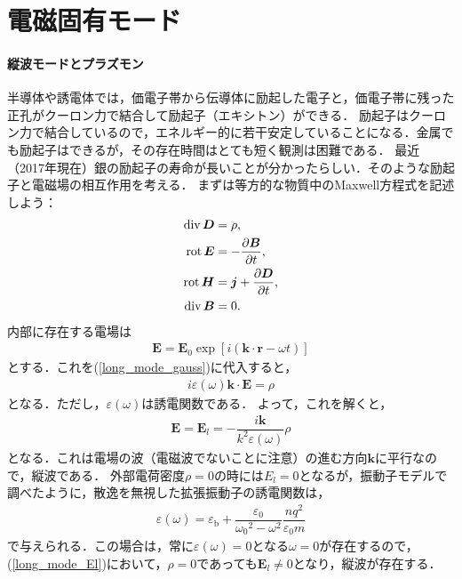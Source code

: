\relax
\section{電磁固有モード}
\paragraph{縦波モードとプラズモン}
半導体や誘電体では，価電子帯から伝導体に励起した電子と，価電子帯に残った正孔がクーロン力で結合して励起子（エキシトン）ができる．
励起子はクーロン力で結合しているので，エネルギー的に若干安定していることになる．金属でも励起子はできるが，その存在時間はとても短く観測は困難である．
最近（2017年現在）銀の励起子の寿命が長いことが分かったらしい．そのような励起子と電磁場の相互作用を考える．
まずは等方的な物質中のMaxwell方程式を記述しよう：
\begin{align}
  \operatorname{div} \boldsymbol{D} &= \rho\label{long_mode_gauss}, \\
  \operatorname{rot} \boldsymbol{E} &= -\dfrac{\partial\boldsymbol{B}}{\partial{t}}, \\
  \operatorname{rot} \boldsymbol{H} &= \boldsymbol{j} + \dfrac{\partial\boldsymbol{D}}{\partial{t}}, \\
  \operatorname{div} \boldsymbol{B} &= 0.
\end{align}
内部に存在する電場は
\begin{align}
  \boldsymbol{E} = \boldsymbol{E}_0\exp\left[i(\boldsymbol{k}\cdot\boldsymbol{r}-\omega{t})\right]
\end{align}
とする．これを(\ref{long_mode_gauss})に代入すると，
\begin{align}
  i\varepsilon(\omega)\boldsymbol{k}\cdot\boldsymbol{E}=\rho
\end{align}
となる．ただし，$\varepsilon(\omega)$は誘電関数である．
よって，これを解くと，
\begin{align}
  \boldsymbol{E}=\boldsymbol{E}_l=-\dfrac{i\boldsymbol{k}}{k^2\varepsilon(\omega)}\rho\label{long_mode_El}
\end{align}
となる．これは電場の波（電磁波でないことに注意）の進む方向$\boldsymbol{k}$に平行なので，縦波である．
外部電荷密度$\rho=0$の時には$E_l=0$となるが，振動子モデルで調べたように，散逸を無視した拡張振動子の誘電関数は，
\begin{align}
  \varepsilon(\omega)=\varepsilon_\text{b}+\dfrac{\varepsilon_0}{{\omega_0}^2-\omega^2}\dfrac{nq^2}{\varepsilon_0m}\label{long_mode_permittivity}
\end{align}
で与えられる．この場合は，常に$\varepsilon(\omega)=0$となる$\omega=0$が存在するので，(\ref{long_mode_El})において，$\rho=0$であっても$\boldsymbol{E}_l\neq0$となり，縦波が存在する．
